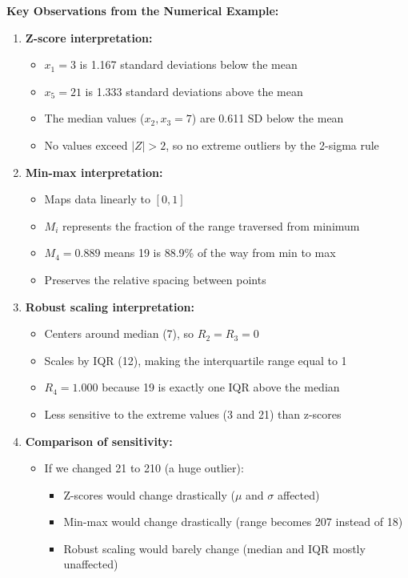\documentclass[12pt]{article}
\begin{document}
\begin{explanation}
\textbf{Key Observations from the Numerical Example:}

\begin{enumerate}
    \item \textbf{Z-score interpretation:}
    \begin{itemize}
        \item \(x_1 = 3\) is 1.167 standard deviations below the mean
        \item \(x_5 = 21\) is 1.333 standard deviations above the mean
        \item The median values (\(x_2, x_3 = 7\)) are 0.611 SD below the mean
        \item No values exceed \(|Z| > 2\), so no extreme outliers by the 2-sigma rule
    \end{itemize}

    \item \textbf{Min-max interpretation:}
    \begin{itemize}
        \item Maps data linearly to \([0, 1]\)
        \item \(M_i\) represents the fraction of the range traversed from minimum
        \item \(M_4 = 0.889\) means 19 is 88.9\% of the way from min to max
        \item Preserves the relative spacing between points
    \end{itemize}

    \item \textbf{Robust scaling interpretation:}
    \begin{itemize}
        \item Centers around median (7), so \(R_{2} = R_{3} = 0\)
        \item Scales by IQR (12), making the interquartile range equal to 1
        \item \(R_4 = 1.000\) because 19 is exactly one IQR above the median
        \item Less sensitive to the extreme values (3 and 21) than z-scores
    \end{itemize}

    \item \textbf{Comparison of sensitivity:}
    \begin{itemize}
        \item If we changed 21 to 210 (a huge outlier):
        \begin{itemize}
            \item Z-scores would change drastically (\(\mu\) and \(\sigma\) affected)
            \item Min-max would change drastically (range becomes 207 instead of 18)
            \item Robust scaling would barely change (median and IQR mostly unaffected)
        \end{itemize}
    \end{itemize}


\end{enumerate}
\end{explanation}
\end{document}
